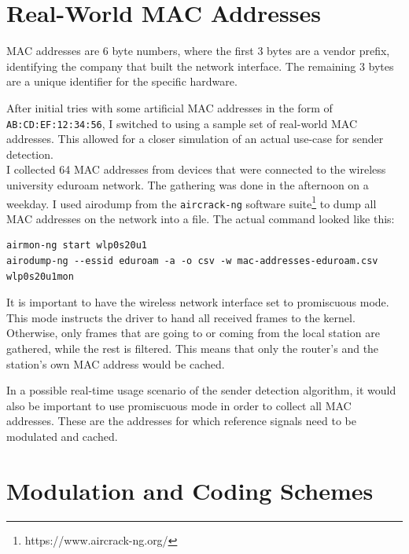 
\section{Real-World MAC Addresses}\label{sec:real-world-macs}

\gls{MAC} addresses are 6 byte numbers, where the first 3 bytes are a vendor prefix, identifying the company that built the network interface. The remaining 3 bytes are a unique identifier for the specific hardware.

After initial tries with some artificial \gls{MAC} addresses in the form of \texttt{AB:CD:EF:12:34:56}, I switched to using a sample set of real-world \gls{MAC} addresses. This allowed for a closer simulation of an actual use-case for sender detection.\\

I collected 64 \gls{MAC} addresses from devices that were connected to the wireless university eduroam network. The gathering was done in the afternoon on a weekday. I used airodump from the \texttt{aircrack-ng} software suite\footnote{https://www.aircrack-ng.org/} to dump all \gls{MAC} addresses on the network into a file. The actual command looked like this:

\begin{lstlisting}[captionpos=b,caption={Capture Real-World MAC Addresses},label=lst:airodump]
airmon-ng start wlp0s20u1
airodump-ng --essid eduroam -a -o csv -w mac-addresses-eduroam.csv wlp0s20u1mon
\end{lstlisting}

It is important to have the wireless network interface set to promiscuous mode. This mode instructs the driver to hand all received frames to the kernel. Otherwise, only frames that are going to or coming from the local station are gathered, while the rest is filtered. This means that only the router's and the station's own \gls{MAC} address would be cached.

In a possible real-time usage scenario of the sender detection algorithm, it would also be important to use promiscuous mode in order to collect all \gls{MAC} addresses. These are the addresses for which reference signals need to be modulated and cached.



\section{Modulation and Coding Schemes}\label{sec:ex-mcs}

